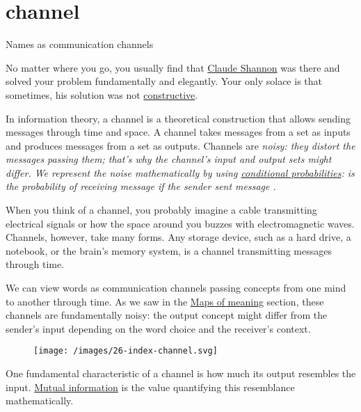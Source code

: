 \documentclass{article}
\begin{document}
\section{channel}{Names as communication channels}

No matter where you go, you usually find that \href{https://en.wikipedia.org/wiki/Claude_Shannon}{Claude Shannon} was there and solved your problem fundamentally and elegantly.
Your only solace is that sometimes, his solution was not \href{https://en.wikipedia.org/wiki/Constructive_proof}{constructive}.

In information theory, a channel is a theoretical construction that allows sending messages through time and space.
A channel takes messages from a set  as inputs and produces messages from a set  as outputs.
Channels are \em{noisy}: they distort the messages passing them; that's why the channel's input and output sets might differ.
We represent the noise mathematically by using \href{https://en.wikipedia.org/wiki/Conditional_probability}{conditional probabilities}:  is the probability of receiving message  if the sender sent message .

When you think of a channel, you probably imagine a cable transmitting electrical signals or how the space around you buzzes with electromagnetic waves.
Channels, however, take many forms.
Any storage device, such as a hard drive, a notebook, or the brain's memory system, is a channel transmitting messages through time.

We can view words as communication channels passing concepts from one mind to another through time.
As we saw in the \href{#maps-of-meaning}{Maps of meaning} section, these channels are fundamentally noisy: the output concept might differ from the sender's input depending on the word choice and the receiver's context.

\begin{figure}[grayscale-diagram]
  \texttt{[image: /images/26-index-channel.svg]}
\end{figure}

One fundamental characteristic of a channel is how much its output resembles the input.
\href{https://en.wikipedia.org/wiki/Mutual_information}{Mutual information} is the value quantifying this resemblance mathematically.
\end{document}
